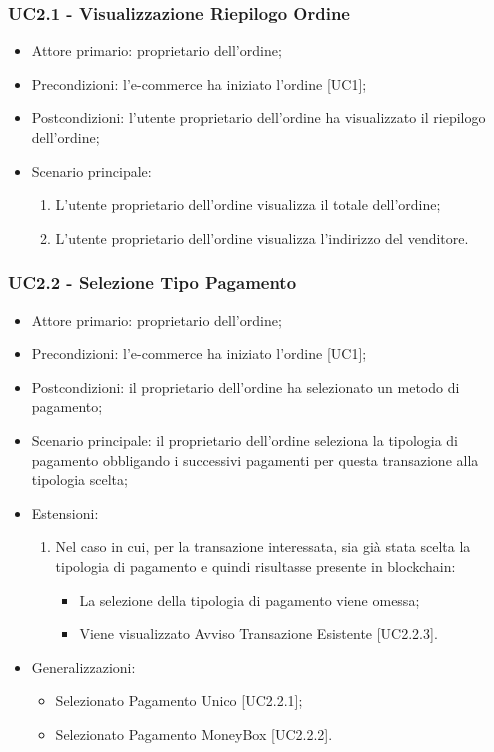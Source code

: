 \subsubsection{UC2.1 - Visualizzazione Riepilogo Ordine}\label{sssec: UC2.1}

\begin{itemize}
    \item Attore primario: proprietario dell'ordine;
    \item Precondizioni: l'e-commerce\glo{} ha iniziato l'ordine [UC1];
    \item Postcondizioni: l'utente proprietario dell'ordine ha visualizzato il riepilogo dell'ordine;
    \item Scenario principale:
          \begin{enumerate}
              \item L'utente proprietario dell'ordine visualizza il totale dell'ordine;
              \item L'utente proprietario dell'ordine visualizza l'indirizzo del venditore.
          \end{enumerate}
\end{itemize}

\subsubsection{UC2.2 - Selezione Tipo Pagamento}\label{sssec: UC2.2}

\begin{itemize}
    \item Attore primario: proprietario dell'ordine;
    \item Precondizioni: l'e-commerce\glo{} ha iniziato l'ordine [UC1];
    \item Postcondizioni: il proprietario dell'ordine ha selezionato un metodo di pagamento;
    \item Scenario principale: il proprietario dell'ordine seleziona la tipologia di pagamento obbligando i successivi pagamenti per questa transazione alla tipologia scelta;
    \item Estensioni:
    \begin{enumerate}
    \item Nel caso in cui, per la transazione interessata, sia già stata scelta la tipologia di pagamento e quindi risultasse presente in blockchain\glo{}:
        \begin{itemize}
            \item La selezione della tipologia di pagamento viene omessa;
            \item Viene visualizzato Avviso Transazione Esistente [UC2.2.3].
        \end{itemize}
    \end{enumerate}
    \item Generalizzazioni:
    \begin{itemize}
        \item Selezionato Pagamento Unico [UC2.2.1];
        \item Selezionato Pagamento MoneyBox\glo{} [UC2.2.2].
    \end{itemize}
\end{itemize}

